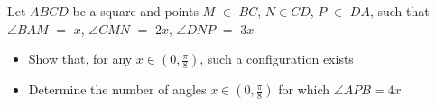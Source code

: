 Let $ABCD$ be a square and points $M$ $\in$ $BC$, $N \in CD$, $P$ $\in$ $DA$, such that $\angle BAM$ $=$ $x$, $\angle CMN$ $=$ $2x$, $\angle DNP$ $=$ $3x$
\begin{itemize}
	\item Show that, for any $x \in (0, \tfrac{\pi}{8} )$, such a configuration exists
	\item Determine the number of angles $x \in ( 0, \tfrac{\pi}{8} )$ for which $\angle APB =4x$
\end{itemize}
